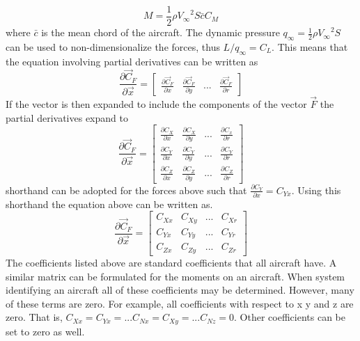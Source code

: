 \documentclass{article}
\begin{document}
\begin{equation}
M = \frac{1}2\rho {V_{\infty}}^2 S \bar{c} C_M
\end{equation}
where $\bar{c}$ is the mean chord of the aircraft. The dynamic pressure $q_{\infty} =
\frac{1}2\rho {V_{\infty}}^2 S$ can be used to non-dimensionalize the forces, thus $L/q_{\infty} = C_L$. This means
that the equation involving partial derivatives can be written as
\begin{equation}
\frac{\partial \vec{C}_F}{\partial \vec{x}} = \begin{bmatrix} \frac{\partial
    \vec{C}_F}{\partial x} & \frac{\partial \vec{C}_F}{\partial y} & ... &
  \frac{\partial \vec{C}_F}{\partial r} \end{bmatrix}
\end{equation}
If the vector is then expanded to include the components of the vector
$\vec{F}$ the partial derivatives expand to
\begin{equation}
\frac{\partial \vec{C}_F}{\partial \vec{x}} = \begin{bmatrix}
  \frac{\partial C_X}{\partial x} & \frac{\partial C_X}{\partial y} &
  ... & \frac{\partial C_x}{\partial r} \\ \frac{\partial C_Y}{\partial x} & \frac{\partial C_Y}{\partial y} &
  ... & \frac{\partial C_Y}{\partial r} \\ \frac{\partial C_Z}{\partial x} & \frac{\partial C_Z}{\partial y} &
  ... & \frac{\partial C_Z}{\partial r} \end{bmatrix}
\end{equation}
shorthand can be adopted for the forces above such that
$\frac{\partial C_Y}{\partial x} = C_{Yx}$. Using this shorthand the
equation above can be written as.
\begin{equation}
\frac{\partial \vec{C}_F}{\partial \vec{x}} = \begin{bmatrix}
  C_{Xx} & C_{Xy} &
  ... & C_{Xr} \\ C_{Yx} & C_{Yy} &
  ... & C_{Yr} \\ C_{Zx} & C_{Zy} &
  ... & C_{Zr} \end{bmatrix}
\end{equation}
The coefficients listed above are standard coefficients that all
aircraft have. A similar matrix can be formulated for the moments on
an aircraft. When system identifying an aircraft all of these
coefficients may be determined. However, many of these terms are
zero. For example, all coefficients with respect to x y and z are
zero. That is, $C_{Xx} = C_{Yx} = ... C_{Nx} = C_{Xy} = ... C_{Nz} =
0$. Other coefficients can be set to zero as well. 
\end{document}
